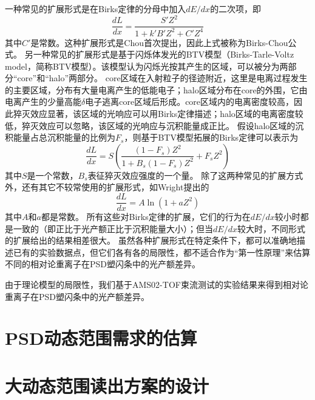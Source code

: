 一种常见的扩展形式是在Birks定律的分母中加入$dE/dx$的二次项，即
\begin{equation}
	\frac{dL}{dx} = \frac{S' Z^2}{1+k'B'Z^2+C'Z^4}
	\label{eq:dynamic_range:birks_chou_law}
\end{equation}
其中$C'$是常数。这种扩展形式是Chou首次提出\cite{chou_nature_1952}，因此上式被称为Birks-Chou公式。
另一种常见的扩展形式是基于闪烁体发光的BTV模型\cite{voltz_influence_1966,tarle_cosmic_1979}（Birks-Tarle-Voltz model，简称BTV模型）。该模型认为闪烁光按其产生的区域，可以被分为两部分“core”和“halo”两部分。
core区域在入射粒子的径迹附近，这里是电离过程发生的主要区域，分布有大量电离产生的低能电子；halo区域分布在core的外围，它由电离产生的少量高能$\delta$电子逃离core区域后形成。core区域内的电离密度较高，因此猝灭效应显著，该区域的光响应可以用Birks定律描述；halo区域的电离密度较低，猝灭效应可以忽略，该区域的光响应与沉积能量成正比。
假设halo区域的沉积能量占总沉积能量的比例为$F_s$，则基于BTV模型拓展的Birks定律可以表示为
\begin{equation}
	\frac{dL}{dx} = S(\frac{(1-F_s)Z^2}{1+B_s(1-F_s)Z^2}+F_sZ^2)
	\label{eq:dynamic_range:btv_law}
\end{equation}
其中$S$是一个常数，$B_s$表征猝灭效应强度的一个量。
除了这两种常见的扩展方式外，还有其它不较常使用的扩展形式，如Wright提出的\cite{wright_scintillation_1953}
\begin{equation}
	\frac{dL}{dx} = A \ln(1+aZ^2)
	\label{eq:dynamic_range:wright_law}
\end{equation}
其中$A$和$a$都是常数。
所有这些对Birks定律的扩展，它们的行为在$dE/dx$较小时都是一致的（即正比于光产额正比于沉积能量大小）；但当$dE/dx$较大时，不同形式的扩展给出的结果相差很大。
虽然各种扩展形式在特定条件下，都可以准确地描述已有的实验数据点，但它们各有各的局限性，都不适合作为“第一性原理”来估算不同的相对论重离子在PSD塑闪条中的光产额差异。

由于理论模型的局限性，我们基于AMS02-TOF束流测试的实验结果来得到相对论重离子在PSD塑闪条中的光产额差异。



\section{PSD动态范围需求的估算}
\label{sec:dynamic_range:estimation}

\section{大动态范围读出方案的设计}
\label{sec:dynamic_range:design}

